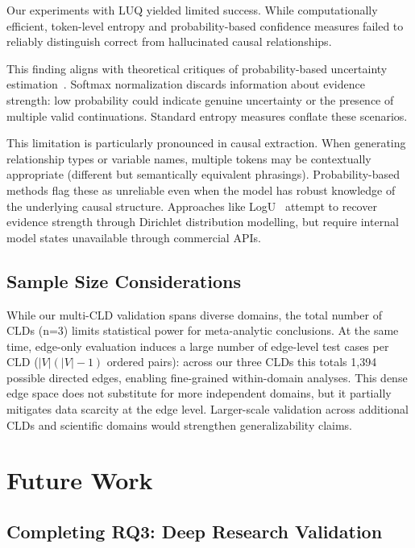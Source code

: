 Our experiments with LUQ yielded limited success. While computationally efficient, token-level entropy and probability-based confidence measures failed to reliably distinguish correct from hallucinated causal relationships.

This finding aligns with theoretical critiques of probability-based uncertainty estimation~\citep{ma2025estimatingllmuncertainty}. Softmax normalization discards information about evidence strength: low probability could indicate genuine uncertainty or the presence of multiple valid continuations. Standard entropy measures conflate these scenarios.

This limitation is particularly pronounced in causal extraction. When generating relationship types or variable names, multiple tokens may be contextually appropriate (different but semantically equivalent phrasings). Probability-based methods flag these as unreliable even when the model has robust knowledge of the underlying causal structure. Approaches like LogU~\citep{ma2025estimatingllmuncertainty} attempt to recover evidence strength through Dirichlet distribution modelling, but require internal model states unavailable through commercial APIs.

\subsection{Sample Size Considerations}

While our multi-CLD validation spans diverse domains, the total number of CLDs (n=3) limits statistical power for meta-analytic conclusions. At the same time, edge-only evaluation induces a large number of edge-level test cases per CLD ($|V|(|V|-1)$ ordered pairs): across our three CLDs this totals 1,394 possible directed edges, enabling fine-grained within-domain analyses. This dense edge space does not substitute for more independent domains, but it partially mitigates data scarcity at the edge level. Larger-scale validation across additional CLDs and scientific domains would strengthen generalizability claims.

\section{Future Work}
\label{sec:discussion_future}

\subsection{Completing RQ3: Deep Research Validation}

